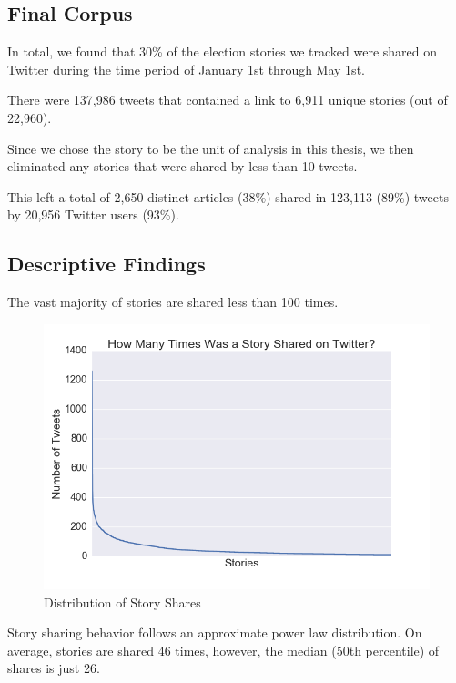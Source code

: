 \documentclass[letterpaper]{article}
\begin{document}
\subsection{Final Corpus}

In total, we found that 30\% of the election stories we tracked were shared on Twitter during the time period of January 1st through May 1st.

There were 137,986 tweets that contained a link to 6,911 unique stories (out of 22,960).

Since we chose the story to be the unit of analysis in this thesis, we then eliminated any stories that were shared by less than 10 tweets.

This left a total of 2,650 distinct articles (38\%) shared in 123,113 (89\%) tweets by 20,956 Twitter users (93\%).

\subsection{Descriptive Findings}
The vast majority of stories are shared less than 100 times. 

\begin{figure}[t!]
\centering 
  \includegraphics[width=\columnwidth]{story-share-dist}  
  \caption{Distribution of Story Shares
    \label{fig:story-share-dist}}
\end{figure} 



Story sharing behavior follows an approximate power law distribution. On average, stories are shared 46 times, however, the median (50th percentile) of shares is just 26. 
\end{document}
